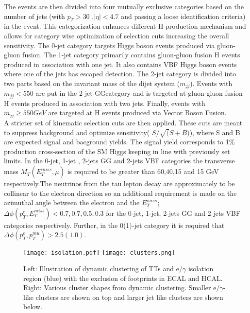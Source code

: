 \documentclass[a4paper,11pt]{article}
\begin{document}
The events are then divided into four mutually exclusive categories  based on the number of jets (with $p_{T}>30$ ,$|\eta|<4.7$ and passing a loose identification criteria) in the event. This categorization enhances different H production mechanism and allows for category wise optimization of selection cuts increasing the overall sensitivity. The 0-jet category targets Higgs boson events produced via gluon-gluon fusion. The 1-jet category primarily contains gluon-gluon fusion H events produced in association with one jet. It also contains VBF Higgs boson events where one of the jets has escaped detection. The 2-jet category is divided into two parts based on the invariant mass of the dijet system ($m_{jj}$). Events with $m_{jj}<550$ are put in the 2-jet-GGcategory and is targeted at gluon-gluon fusion H events produced in association with two jets. Finally, events with $m_{jj} \geq 550 GeV$ are targeted at H events produced via Vector Boson Fusion.\\

A stricter set of kinematic selection cuts are then applied. These cuts are meant to suppress background and optimize sensitivity( $S/\sqrt(S+B)$), where S and B are expected signal and bacground yields. The signal yield corresponds to 1\% production cross-section of the SM Higgs keeping in line with previously set limits. In the 0-jet, 1-jet , 2-jets GG and 2-jets VBF categories the transverse mass $M_{T}(E_{T}^{miss}, \mu)$ is required to be greater than 60,40,15 and 15 GeV respectively.The neutrinos from the tau lepton decay are approximately to be collinear to the electron direction so an additional requirement is made on the azimuthal angle between the electron and the $E_{T}^{miss}$;  $\Delta\phi(p_{T}^e, E_{T}^{miss}) < 0.7,0.7,0.5,0.3$ for the 0-jet, 1-jet, 2-jets GG and 2 jets VBF categories respectively. Further, in the 0(1)-jet category it is  required that  $\Delta\phi(p_{T}^e, p_{T}^{mu}) >2.5 (1.0)$.


\begin{figure}[htbp]
\centering %
\texttt{[image: isolation.pdf]}
\qquad
\texttt{[image: clusters.png]}
\caption{\label{fig:k} Left: Illustration of dynamic clustering of TTs and e/$\gamma$ isolation region (blue) with the exclusion of footprints in ECAL and HCAL. Right: Various cluster shapes from dynamic clustering. Smaller e/$\gamma$-like clusters are shown on top and larger jet like clusters are shown below.}
\end{figure}
\end{document}
